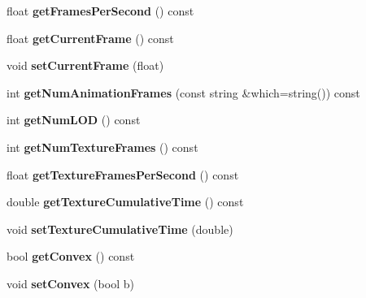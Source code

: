 \begin{DoxyCompactItemize}
\item 
float {\bfseries get\+Frames\+Per\+Second} () const \hypertarget{classMesh_afdc2e23926f07396d371e44a27c24a08}{}\label{classMesh_afdc2e23926f07396d371e44a27c24a08}

\item 
float {\bfseries get\+Current\+Frame} () const \hypertarget{classMesh_a259b2813ea29272077033eb93c27ab52}{}\label{classMesh_a259b2813ea29272077033eb93c27ab52}

\item 
void {\bfseries set\+Current\+Frame} (float)\hypertarget{classMesh_a0c479b41efbf2e69345c28dd88af8e8d}{}\label{classMesh_a0c479b41efbf2e69345c28dd88af8e8d}

\item 
int {\bfseries get\+Num\+Animation\+Frames} (const string \&which=string()) const \hypertarget{classMesh_a13eeeb0fac44df0d164f7d957f638c3e}{}\label{classMesh_a13eeeb0fac44df0d164f7d957f638c3e}

\item 
int {\bfseries get\+Num\+L\+OD} () const \hypertarget{classMesh_a5f2969487b8ce6071a43d6e64ae680d8}{}\label{classMesh_a5f2969487b8ce6071a43d6e64ae680d8}

\item 
int {\bfseries get\+Num\+Texture\+Frames} () const \hypertarget{classMesh_aaeac910ba208c2327318cb42e400e8af}{}\label{classMesh_aaeac910ba208c2327318cb42e400e8af}

\item 
float {\bfseries get\+Texture\+Frames\+Per\+Second} () const \hypertarget{classMesh_adbeae132b8096d35f828653f9204e1a0}{}\label{classMesh_adbeae132b8096d35f828653f9204e1a0}

\item 
double {\bfseries get\+Texture\+Cumulative\+Time} () const \hypertarget{classMesh_a529b838346fe0c237edf16d9878da0a9}{}\label{classMesh_a529b838346fe0c237edf16d9878da0a9}

\item 
void {\bfseries set\+Texture\+Cumulative\+Time} (double)\hypertarget{classMesh_a0ea6dc9937625edece8d05e322538b2f}{}\label{classMesh_a0ea6dc9937625edece8d05e322538b2f}

\item 
bool {\bfseries get\+Convex} () const \hypertarget{classMesh_a0bb3c31d6e7315fdb5f9dde3ff4c1988}{}\label{classMesh_a0bb3c31d6e7315fdb5f9dde3ff4c1988}

\item 
void {\bfseries set\+Convex} (bool b)\hypertarget{classMesh_a1bcbead4254f773c0cf027527e12d282}{}\label{classMesh_a1bcbead4254f773c0cf027527e12d282}


\end{DoxyCompactItemize}
